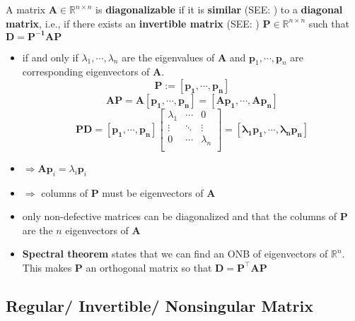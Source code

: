 A matrix $\mathbf{A} \in \mathbb{R}^{n\times n}$ is \textbf{diagonalizable} if it is \textbf{similar} (SEE: ) to a \textbf{diagonal matrix}, i.e., if there exists an \textbf{invertible matrix} (SEE: ) $\mathbf{P} \in \mathbb{R}^{n\times n}$ such that $\mathbf{D = P^{-1}AP}$

\begin{itemize}
    \item if and only if $\lambda_1, \cdots , \lambda_n$ are the eigenvalues of $\mathbf{A}$ and $\mathbf{p}_1, \cdots , \mathbf{p}_n$ are corresponding eigenvectors of $\mathbf{A}$.
\[
    \mathbf{P := [p_1, \cdots , p_n]}
\]
\[
    \mathbf{AP = A[p_1, \cdots , p_n] = [Ap_1, \cdots , Ap_n]}
\]
\[
    \mathbf{PD} = \mathbf{[p_1, \cdots , p_n]}\begin{bmatrix}
        \lambda_1 & \cdots & 0 \\
        \vdots & \ddots & \vdots \\
        0 & \cdots & \lambda_n \\
    \end{bmatrix} = \mathbf{[\lambda_1 p_1, \cdots ,\lambda_n p_n]}
\]
    
\end{itemize}
\begin{itemize}
    \item[] $\Rightarrow \mathbf{Ap}_i = \lambda_i \mathbf{p}_i$

    \item[] $\Rightarrow$ columns of $\mathbf{P}$ must be eigenvectors of $\mathbf{A}$

    \item only non-defective matrices can be diagonalized and that the columns of $\mathbf{P}$ are the $n$ eigenvectors of $\mathbf{A}$

    \item \textbf{Spectral theorem} states that we can find an ONB of eigenvectors of $\mathbb{R}^n$. This makes $\mathbf{P}$ an orthogonal matrix so that $\mathbf{D = P^\top AP}$
\end{itemize}



\subsection{Regular/ Invertible/ Nonsingular Matrix \cite{mfml-1}} \label{Regular/ Invertible/ Nonsingular Matrix}


